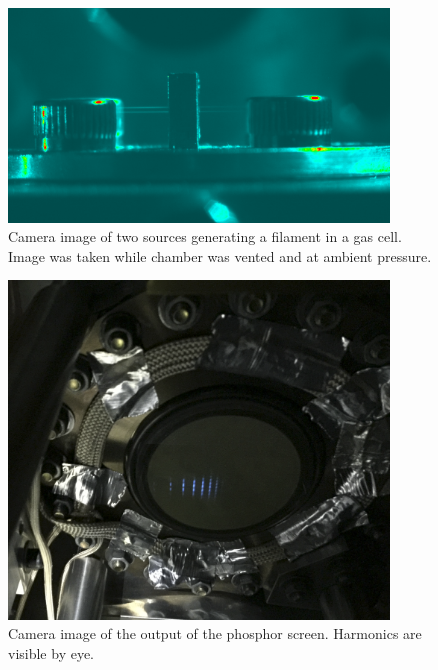 \begin{figure}
	\centering
	\includegraphics[width=0.9\textwidth]{figures/Two_source/ts_filament_gas_cell.png}
	\caption{Camera image of two sources generating a filament in a gas cell. Image was taken while chamber was vented and at ambient pressure.}
	\label{ts_filament}
\end{figure}


\begin{figure}
	\centering
	\includegraphics[width=0.9\textwidth]{figures/Two_source/MCP_ts_harmonics.png}
	\caption{Camera image of the output of the phosphor screen.  Harmonics are visible by eye.}
	\label{MCP_ts_harmonics}
\end{figure}


